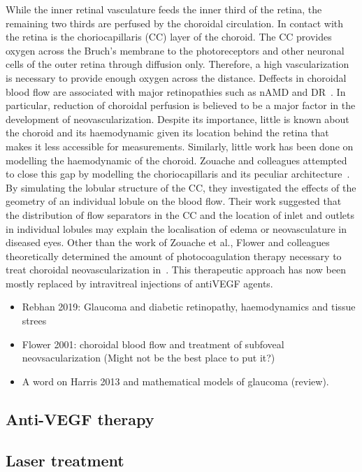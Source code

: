 \documentclass[12pt,a4paper]{article}
\begin{document}
While the inner retinal vasculature feeds the inner third of the retina, the remaining two thirds are perfused by the choroidal circulation.
In contact with the retina is the choriocapillaris (CC) layer of the choroid.
The CC provides oxygen across the Bruch's membrane to the photoreceptors and other neuronal cells of the outer retina through diffusion only.
Therefore, a high vascularization is necessary to provide enough oxygen across the distance.
Deffects in choroidal blood flow are associated with major retinopathies such as nAMD and DR~\cite{Pemp_2008}.
In particular, reduction of choroidal perfusion is believed to be a major factor in the development of neovascularization.
Despite its importance, little is known about the choroid and its haemodynamic given its location behind the retina that makes it less accessible for measurements. 
Similarly, little work has been done on modelling the haemodynamic of the choroid.
Zouache and colleagues attempted to close this gap by modelling the choriocapillaris and its peculiar architecture~\cite{Zouache_2015}.
By simulating the lobular structure of the CC, they investigated the effects of the geometry of an individual lobule on the blood flow.
Their work suggested that the distribution of flow separators in the CC and the location of inlet and outlets in individual lobules may explain the localisation of edema or neovasculature in diseased eyes.
Other than the work of Zouache et al., Flower and colleagues theoretically determined the amount of photocoagulation therapy necessary to treat choroidal neovascularization in~\cite{Flower_2001}.
This therapeutic approach has now been mostly replaced by intravitreal injections of antiVEGF agents.

\begin{itemize}
\item Rebhan 2019: Glaucoma and diabetic retinopathy, haemodynamics and tissue strees
\item Flower 2001: choroidal blood flow and treatment of subfoveal neovsacularization (Might not be the best place to put it?)
\item A word on Harris 2013 and mathematical models of glaucoma (review).
\end{itemize}


\subsection{Anti-VEGF therapy}

\subsection{Laser treatment}

{\normalsize }
\end{document}
